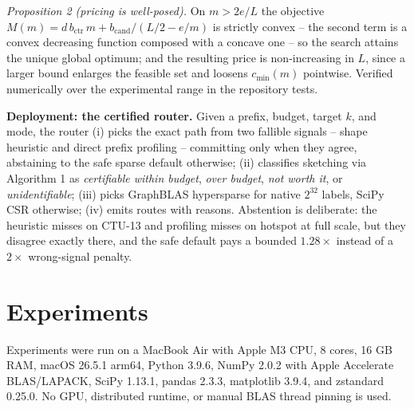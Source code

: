 \documentclass[conference]{IEEEtran}
\begin{document}
\noindent\emph{Proposition 2 (pricing is well-posed).} On $m>2e/L$ the objective $M(m)=d\,b_{\mathrm{ctr}}\,m+b_{\mathrm{cand}}/(L/2-e/m)$ is strictly convex -- the second term is a convex decreasing function composed with a concave one -- so the search attains the unique global optimum; and the resulting price is non-increasing in $L$, since a larger bound enlarges the feasible set and loosens $c_{\min}(m)$ pointwise. Verified numerically over the experimental range in the repository tests.

\noindent\textbf{Deployment: the certified router.} Given a prefix, budget, target $k$, and mode, the router (i) picks the exact path from two fallible signals -- shape heuristic and direct prefix profiling -- committing only when they agree, abstaining to the safe sparse default otherwise; (ii) classifies sketching via Algorithm 1 as \emph{certifiable within budget}, \emph{over budget}, \emph{not worth it}, or \emph{unidentifiable}; (iii) picks GraphBLAS hypersparse for native $2^{32}$ labels, SciPy CSR otherwise; (iv) emits routes with reasons. Abstention is deliberate: the heuristic misses on CTU-13 and profiling misses on hotspot at full scale, but they disagree exactly there, and the safe default pays a bounded $1.28\times$ instead of a $2\times$ wrong-signal penalty.

\section{Experiments}
\label{sec:experiments}
Experiments were run on a MacBook Air with Apple M3 CPU, 8 cores, 16 GB RAM, macOS 26.5.1 arm64, Python 3.9.6, NumPy 2.0.2 with Apple Accelerate BLAS/LAPACK, SciPy 1.13.1, pandas 2.3.3, matplotlib 3.9.4, and zstandard 0.25.0. No GPU, distributed runtime, or manual BLAS thread pinning is used.
\end{document}
